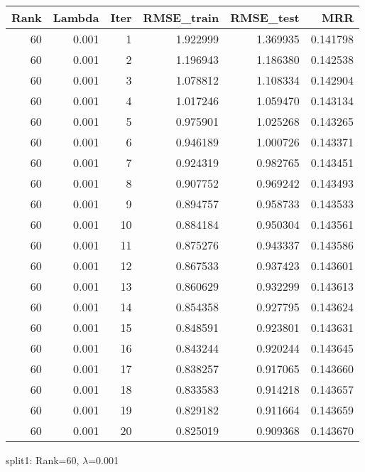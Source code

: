 \begin{tabular}{rrrrrr}
\toprule
 Rank &  Lambda &  Iter &  RMSE\_train &  RMSE\_test &       MRR \\
\midrule
   60 &   0.001 &     1 &    1.922999 &   1.369935 &  0.141798 \\
   60 &   0.001 &     2 &    1.196943 &   1.186380 &  0.142538 \\
   60 &   0.001 &     3 &    1.078812 &   1.108334 &  0.142904 \\
   60 &   0.001 &     4 &    1.017246 &   1.059470 &  0.143134 \\
   60 &   0.001 &     5 &    0.975901 &   1.025268 &  0.143265 \\
   60 &   0.001 &     6 &    0.946189 &   1.000726 &  0.143371 \\
   60 &   0.001 &     7 &    0.924319 &   0.982765 &  0.143451 \\
   60 &   0.001 &     8 &    0.907752 &   0.969242 &  0.143493 \\
   60 &   0.001 &     9 &    0.894757 &   0.958733 &  0.143533 \\
   60 &   0.001 &    10 &    0.884184 &   0.950304 &  0.143561 \\
   60 &   0.001 &    11 &    0.875276 &   0.943337 &  0.143586 \\
   60 &   0.001 &    12 &    0.867533 &   0.937423 &  0.143601 \\
   60 &   0.001 &    13 &    0.860629 &   0.932299 &  0.143613 \\
   60 &   0.001 &    14 &    0.854358 &   0.927795 &  0.143624 \\
   60 &   0.001 &    15 &    0.848591 &   0.923801 &  0.143631 \\
   60 &   0.001 &    16 &    0.843244 &   0.920244 &  0.143645 \\
   60 &   0.001 &    17 &    0.838257 &   0.917065 &  0.143660 \\
   60 &   0.001 &    18 &    0.833583 &   0.914218 &  0.143657 \\
   60 &   0.001 &    19 &    0.829182 &   0.911664 &  0.143659 \\
   60 &   0.001 &    20 &    0.825019 &   0.909368 &  0.143670 \\
\bottomrule
\end{tabular}

\caption{split1: Rank=60, $\lambda$=0.001}
